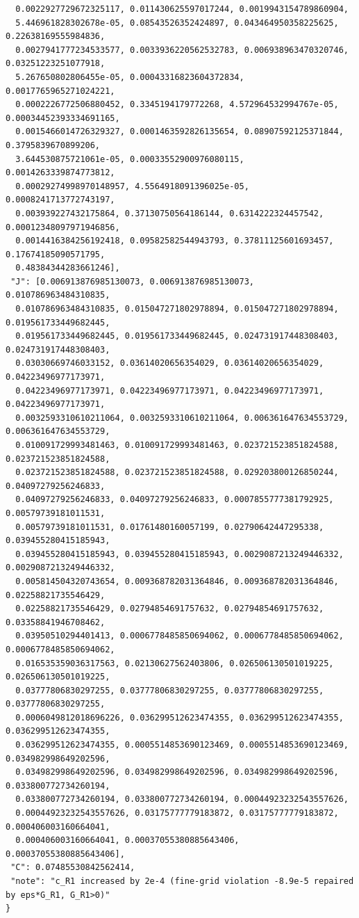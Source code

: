 \documentclass[11pt,reqno]{amsart}
\numberwithin{equation}{section}
\theoremstyle{definition}
\theoremstyle{remark}
\begin{document}
\begin{lstlisting}
  0.0022927729672325117, 0.011430625597017244, 0.0019943154789860904,
  5.446961828302678e-05, 0.08543526352424897, 0.043464950358225625, 0.22638169555984836,
  0.0027941777234533577, 0.0033936220562532783, 0.006938963470320746, 0.03251223251077918,
  5.267650802806455e-05, 0.00043316823604372834, 0.0017765965271024221,
  0.0002226772506880452, 0.3345194179772268, 4.572964532994767e-05, 0.00034452393334691165,
  0.0015466014726329327, 0.0001463592826135654, 0.08907592125371844, 0.3795839670899206,
  3.644530875721061e-05, 0.00033552900976080115, 0.0014263339874773812,
  0.00029274998970148957, 4.5564918091396025e-05, 0.0008241713772743197,
  0.003939227432175864, 0.37130750564186144, 0.6314222324457542, 0.00012348097971946856,
  0.0014416384256192418, 0.09582582544943793, 0.37811125601693457, 0.17674185090571795,
  0.48384344283661246],
 "J": [0.006913876985130073, 0.006913876985130073, 0.010786963484310835,
  0.010786963484310835, 0.015047271802978894, 0.015047271802978894, 0.019561733449682445,
  0.019561733449682445, 0.019561733449682445, 0.024731917448308403, 0.024731917448308403,
  0.03030669746033152, 0.03614020656354029, 0.03614020656354029, 0.04223496977173971,
  0.04223496977173971, 0.04223496977173971, 0.04223496977173971, 0.04223496977173971,
  0.0032593310610211064, 0.0032593310610211064, 0.006361647634553729, 0.006361647634553729,
  0.010091729993481463, 0.010091729993481463, 0.023721523851824588, 0.023721523851824588,
  0.023721523851824588, 0.023721523851824588, 0.029203800126850244, 0.04097279256246833,
  0.04097279256246833, 0.04097279256246833, 0.0007855777381792925, 0.00579739181011531,
  0.00579739181011531, 0.01761480160057199, 0.02790642447295338, 0.039455280415185943,
  0.039455280415185943, 0.039455280415185943, 0.0029087213249446332, 0.0029087213249446332,
  0.005814504320743654, 0.009368782031364846, 0.009368782031364846, 0.02258821735546429,
  0.02258821735546429, 0.02794854691757632, 0.02794854691757632, 0.03358841946708462,
  0.03950510294401413, 0.0006778485850694062, 0.0006778485850694062, 0.0006778485850694062,
  0.016535359036317563, 0.02130627562403806, 0.026506130501019225, 0.026506130501019225,
  0.03777806830297255, 0.03777806830297255, 0.03777806830297255, 0.03777806830297255,
  0.0006049812018696226, 0.036299512623474355, 0.036299512623474355, 0.036299512623474355,
  0.036299512623474355, 0.0005514853690123469, 0.0005514853690123469, 0.034982998649202596,
  0.034982998649202596, 0.034982998649202596, 0.034982998649202596, 0.033800772734260194,
  0.033800772734260194, 0.033800772734260194, 0.00044923232543557626,
  0.00044923232543557626, 0.03175777779183872, 0.03175777779183872, 0.000406003160664041,
  0.000406003160664041, 0.00037055380885643406, 0.00037055380885643406],
 "C": 0.07485530842562414,
 "note": "c_R1 increased by 2e-4 (fine-grid violation -8.9e-5 repaired by eps*G_R1, G_R1>0)"
}
\end{lstlisting}
\end{document}
